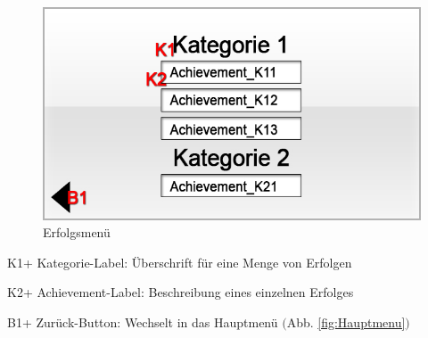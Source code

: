 


\begin{figure}[H]
\centering
\includegraphics[scale=0.55]{../gui/_jpeg_numeration/achievements.jpg}
\caption{Erfolgsmenü}
\label{fig:Erfolgsmenu}
\end{figure}
\begin{description*}
\item[K1+] Kategorie-Label: Überschrift für eine Menge von Erfolgen
\item[K2+] Achievement-Label: Beschreibung eines einzelnen Erfolges
\item[B1+] Zurück-Button: Wechselt in das Hauptmenü $($Abb. \ref{fig:Hauptmenu}$)$
\end{description*}


